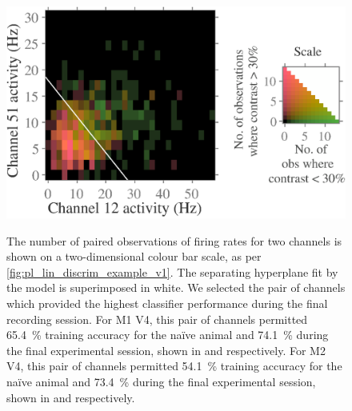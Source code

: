 \begin{figure}[htbp]
{        \includegraphics[scale=.4]{figs/decoding/lindiscrimexLCH-RG-log_cbl_v4_blanco_341_12vs51.eps}}
    \hspace*{\fill}\hspace{.2cm}\hspace*{\fill}
    \caption{
    The number of paired observations of firing rates for two channels is shown on a two-dimensional colour bar scale, as per \autoref{fig:pl_lin_discrim_example_v1}.
    The separating hyperplane fit by the model is superimposed in white.
    We selected the pair of channels which provided the highest classifier performance during the final recording session.
    For \ac{M1} \ac{V4}, this pair of channels permitted \SI{65.4}{\percent} training accuracy for the na\"{i}ve animal and \SI{74.1}{\percent} during the final experimental session, shown in \protect{} and \protect{} respectively.
    For \ac{M2} \ac{V4}, this pair of channels permitted \SI{54.1}{\percent} training accuracy for the na\"{i}ve animal and  \SI{73.4}{\percent} during the final experimental session, shown in \protect{} and \protect{} respectively.
}
    \label{fig:pl_lin_discrim_example_v4}
\end{figure}


